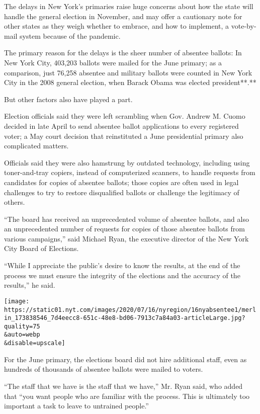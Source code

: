 The delays in New York's primaries raise huge concerns about how the
state will handle the general election in November, and may offer a
cautionary note for other states as they weigh whether to embrace, and
how to implement, a vote-by-mail system because of the pandemic.

The primary reason for the delays is the sheer number of absentee
ballots: In New York City, 403,203 ballots were mailed for the June
primary; as a comparison, just 76,258 absentee and military ballots were
counted in New York City in the 2008 general election, when Barack Obama
was elected president**.**

But other factors also have played a part.

Election officials said they were left scrambling when Gov. Andrew M.
Cuomo decided in late April to send absentee ballot applications to
every registered voter; a May court decision that reinstituted a June
presidential primary also complicated matters.

Officials said they were also hamstrung by outdated technology,
including using toner-and-tray copiers, instead of computerized
scanners, to handle requests from candidates for copies of absentee
ballots; those copies are often used in legal challenges to try to
restore disqualified ballots or challenge the legitimacy of others.

``The board has received an unprecedented volume of absentee ballots,
and also an unprecedented number of requests for copies of those
absentee ballots from various campaigns,'' said Michael Ryan, the
executive director of the New York City Board of Elections.

``While I appreciate the public's desire to know the results, at the end
of the process we must ensure the integrity of the elections and the
accuracy of the results,'' he said.

\texttt{[image: https://static01.nyt.com/images/2020/07/16/nyregion/16nyabsentee1/merlin\_173838546\_7d4eecc8-651c-48e8-bd06-7913c7a84a03-articleLarge.jpg?quality=75\\\&auto=webp\\\&disable=upscale]}

For the June primary, the elections board did not hire additional staff,
even as hundreds of thousands of absentee ballots were mailed to voters.

``The staff that we have is the staff that we have,'' Mr. Ryan said, who
added that ``you want people who are familiar with the process. This is
ultimately too important a task to leave to untrained people.''

